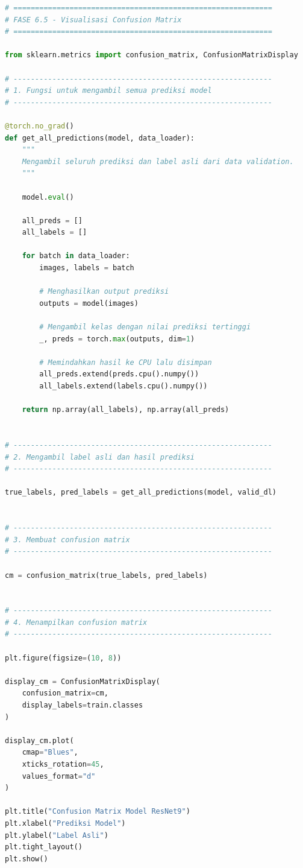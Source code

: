 \begin{lstlisting}[language=Python, caption=Visualisasi confusion matrix]
# ============================================================
# FASE 6.5 - Visualisasi Confusion Matrix
# ============================================================

from sklearn.metrics import confusion_matrix, ConfusionMatrixDisplay

# ------------------------------------------------------------
# 1. Fungsi untuk mengambil semua prediksi model
# ------------------------------------------------------------

@torch.no_grad()
def get_all_predictions(model, data_loader):
    """
    Mengambil seluruh prediksi dan label asli dari data validation.
    """

    model.eval()

    all_preds = []
    all_labels = []

    for batch in data_loader:
        images, labels = batch

        # Menghasilkan output prediksi
        outputs = model(images)

        # Mengambil kelas dengan nilai prediksi tertinggi
        _, preds = torch.max(outputs, dim=1)

        # Memindahkan hasil ke CPU lalu disimpan
        all_preds.extend(preds.cpu().numpy())
        all_labels.extend(labels.cpu().numpy())

    return np.array(all_labels), np.array(all_preds)


# ------------------------------------------------------------
# 2. Mengambil label asli dan hasil prediksi
# ------------------------------------------------------------

true_labels, pred_labels = get_all_predictions(model, valid_dl)


# ------------------------------------------------------------
# 3. Membuat confusion matrix
# ------------------------------------------------------------

cm = confusion_matrix(true_labels, pred_labels)


# ------------------------------------------------------------
# 4. Menampilkan confusion matrix
# ------------------------------------------------------------

plt.figure(figsize=(10, 8))

display_cm = ConfusionMatrixDisplay(
    confusion_matrix=cm,
    display_labels=train.classes
)

display_cm.plot(
    cmap="Blues",
    xticks_rotation=45,
    values_format="d"
)

plt.title("Confusion Matrix Model ResNet9")
plt.xlabel("Prediksi Model")
plt.ylabel("Label Asli")
plt.tight_layout()
plt.show()
\end{lstlisting}

